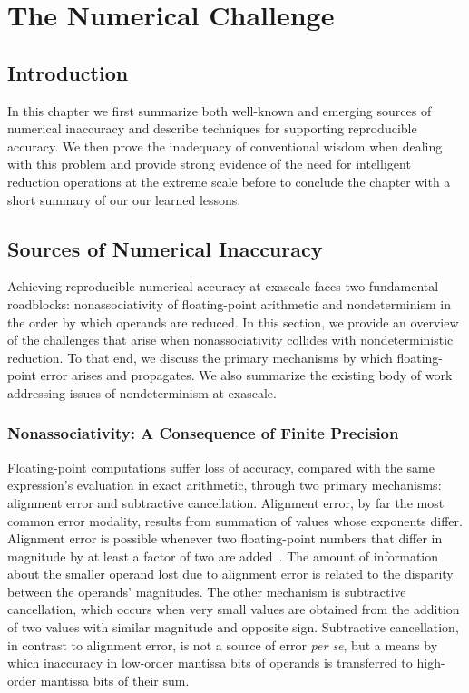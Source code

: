 %
%
\chapter{The Numerical Challenge} \label{chap2}

\section{Introduction}

In this chapter we first summarize both well-known and emerging
sources of numerical inaccuracy and describe techniques for supporting
reproducible accuracy. We then prove the inadequacy of conventional
wisdom when dealing with this problem and provide strong evidence of
the need for intelligent reduction operations at the extreme scale
before to conclude the chapter with a short summary of our our learned
lessons.

\section{Sources of Numerical Inaccuracy}

Achieving reproducible numerical accuracy at exascale faces two
fundamental roadblocks: nonassociativity of floating-point arithmetic
and nondeterminism in the order by which operands are reduced.  In
this section, we provide an overview of the challenges that arise when
nonassociativity collides with nondeterministic reduction. To that
end, we discuss the primary mechanisms by which floating-point error
arises and propagates. We also summarize the existing body of work
addressing issues of nondeterminism at exascale.

\subsection{Nonassociativity: A Consequence of Finite Precision}

Floating-point computations suffer loss of accuracy, compared with the
same expression's evaluation in exact arithmetic, through two primary
mechanisms: alignment error and subtractive cancellation.  Alignment
error, by far the most common error modality, results from summation
of values whose exponents differ. Alignment error is possible whenever
two floating-point numbers that differ in magnitude by at least a
factor of two are added~\cite{Castaldo}. The amount of information
about the smaller operand lost due to alignment error is related to
the disparity between the operands' magnitudes. The other mechanism is
subtractive cancellation, which occurs when very small values are
obtained from the addition of two values with similar magnitude and
opposite sign. Subtractive cancellation, in contrast to alignment
error, is not a source of error \emph{per se}, but a means by which
inaccuracy in low-order mantissa bits of operands is transferred to
high-order mantissa bits of their sum.

